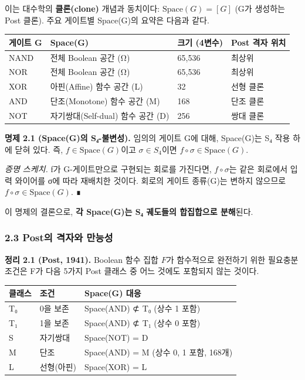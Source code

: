 \documentclass[
]{article}
\newcounter{none} %
\begin{document}
이는 대수학의 \textbf{클론(clone)} 개념과 동치이다:
\(\text{Space}(G) = [G]\) (G가 생성하는 Post 클론). 주요 게이트별
Space(G)의 요약은 다음과 같다.

{\def\LTcaptype{none} %
\begin{longtable}[]{@{}llll@{}}
\toprule\noalign{}
게이트 G & Space(G) & 크기 (4변수) & Post 격자 위치 \\
\midrule\noalign{}
\endhead
\bottomrule\noalign{}
\endlastfoot
NAND & 전체 Boolean 공간 (Ω) & 65,536 & 최상위 \\
NOR & 전체 Boolean 공간 (Ω) & 65,536 & 최상위 \\
XOR & 아핀(Affine) 함수 공간 (L) & 32 & 선형 클론 \\
AND & 단조(Monotone) 함수 공간 (M) & 168 & 단조 클론 \\
NOT & 자기쌍대(Self-dual) 함수 공간 (D) & 256 & 쌍대 클론 \\
\end{longtable}
}

\textbf{명제 2.1 (Space(G)의 S₄-불변성).} 임의의 게이트 G에 대해,
Space(G)는 S₄ 작용 하에 닫혀 있다. 즉, \(f \in \text{Space}(G)\)이고
\(\sigma \in S_4\)이면 \(f \circ \sigma \in \text{Space}(G)\).

\emph{증명 스케치.} f가 G-게이트만으로 구현되는 회로를 가진다면,
\(f \circ \sigma\)는 같은 회로에서 입력 와이어를 σ에 따라 재배치한
것이다. 회로의 게이트 종류(G)는 변하지 않으므로
\(f \circ \sigma \in \text{Space}(G)\). ∎

이 명제의 결론으로, \textbf{각 Space(G)는 S₄ 궤도들의 합집합으로
분해}된다.

\subsubsection{2.3 Post의 격자와
만능성}\label{postuxc758-uxaca9uxc790uxc640-uxb9ccuxb2a5uxc131}

\textbf{정리 2.1 (Post, 1941).} Boolean 함수 집합 \(F\)가 함수적으로
완전하기 위한 필요충분조건은 F가 다음 5가지 Post 클래스 중 어느 것에도
포함되지 않는 것이다.

{\def\LTcaptype{none} %
\begin{longtable}[]{@{}lll@{}}
\toprule\noalign{}
클래스 & 조건 & Space(G) 대응 \\
\midrule\noalign{}
\endhead
\bottomrule\noalign{}
\endlastfoot
T₀ & 0을 보존 & Space(AND) ⊄ T₀ (상수 1 포함) \\
T₁ & 1을 보존 & Space(AND) ⊄ T₁ (상수 0 포함) \\
S & 자기쌍대 & Space(NOT) = D \\
M & 단조 & Space(AND) = M (상수 0, 1 포함, 168개) \\
L & 선형(아핀) & Space(XOR) = L \\
\end{longtable}
}
\end{document}
